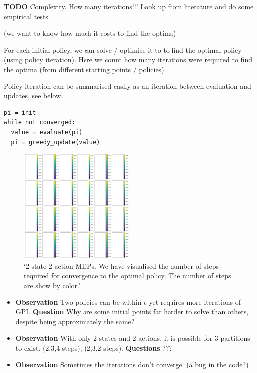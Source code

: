 \textbf{TODO} Complexity. How many iterations!!! Look up from literature
and do some empirical tests.

(we want to know how much it costs to find the optima)

For each initial policy, we can solve / optimise it to to find the
optimal policy (using policy iteration). Here we count how many
iterations were required to find the optima (from different starting
points / policies).

Policy iteration can be summarised easily as an iteration between
evaluation and updates, see below.

\begin{verbatim}
pi = init
while not converged:
  value = evaluate(pi)
  pi = greedy_update(value)
\end{verbatim}

\begin{figure}
\centering
\includegraphics[width=0.5\textwidth,height=0.5\textheight]{../../pictures/figures/gpi-partitions.png}
\caption{`2-state 2-action MDPs. We have visualised the number of steps
required for convergence to the optimal policy. The number of steps are
show by color.'}
\end{figure}

\begin{itemize}
\item
  \textbf{Observation} Two policies can be within \(\epsilon\) yet
  requires more iterations of GPI. \textbf{Question} Why are some
  initial points far harder to solve than others, despite being
  approximately the same?
\item
  \textbf{Observation} With only 2 states and 2 actions, it is possible
  for 3 partitions to exist. (2,3,4 steps), (2,3,2 steps).
  \textbf{Questions} ???
\item
  \textbf{Observation} Sometimes the iterations don't converge. (a bug
  in the code?)
\end{itemize}

